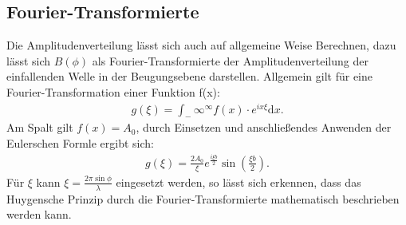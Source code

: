\subsection{Fourier-Transformierte}
Die Amplitudenverteilung lässt sich auch auf allgemeine Weise Berechnen, dazu lässt sich $B(\phi)$ als
Fourier-Transformierte der Amplitudenverteilung der einfallenden Welle in der Beugungsebene darstellen.
Allgemein gilt für eine Fourier-Transformation einer Funktion f(x):
\begin{align}
g(\xi)= \int_-\infty^\infty f(x) \cdot e^{ix\xi} \mathrm{d}x.
\end{align}
Am Spalt gilt $f(x)=A_0$, durch  Einsetzen und anschließendes Anwenden der Eulerschen Formle ergibt sich:
\begin{align}
g(\xi)=\frac{2A_0}{\xi} e^{\frac{i\xi b}{2}}\sin\left(\frac{\xi b}{2}\right).
\end{align}
Für $\xi$ kann $\xi=\frac{2\pi\sin\phi}{\lambda}$ eingesetzt werden, so lässt sich erkennen, dass das Huygensche Prinzip
durch die Fourier-Transformierte mathematisch beschrieben werden kann.
